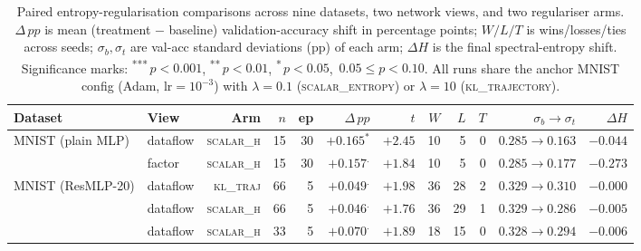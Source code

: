 %
%

\begin{table}[t]
\centering
\caption{Paired entropy-regularisation comparisons across nine datasets,
two network views, and two regulariser arms.
$\Delta\,pp$ is mean (treatment $-$ baseline) validation-accuracy shift
in percentage points; $W/L/T$ is wins/losses/ties across seeds;
$\sigma_b,\sigma_t$ are val-acc standard deviations (pp) of each arm;
$\Delta H$ is the final spectral-entropy shift.
Significance marks: \textsuperscript{***}\,$p{<}0.001$,
\textsuperscript{**}\,$p{<}0.01$,
\textsuperscript{*}\,$p{<}0.05$,
\textsuperscript{\textperiodcentered}\,$0.05{\le}p{<}0.10$.
All runs share the anchor MNIST config (Adam, $\text{lr}=10^{-3}$) with
$\lambda{=}0.1$ (\textsc{scalar\_entropy}) or $\lambda{=}10$
(\textsc{kl\_trajectory}).}
\label{tab:spectral_entropy_views}
\small
\setlength{\tabcolsep}{4pt}
\begin{tabular}{@{}llrrrrrrrrrr@{}}
\toprule
Dataset & View & Arm & $n$ & ep & $\Delta\,pp$ & $t$ & $W$ & $L$ & $T$ & $\sigma_b\!\to\!\sigma_t$ & $\Delta H$ \\
\midrule
\multirow{2}{*}{MNIST (plain MLP)}
  & dataflow & \textsc{scalar\_h}  &  15 & 30 & $+0.165^{*}$    & $+2.45$ & 10 &  5 &   0 & $0.285{\to}0.163$ & $-0.044$ \\
  & factor   & \textsc{scalar\_h}  &  15 & 30 & $+0.157^{.}$    & $+1.84$ & 10 &  5 &   0 & $0.285{\to}0.177$ & $-0.273$ \\
\midrule
\multirow{3}{*}{MNIST (ResMLP-20)}
  & dataflow & \textsc{kl\_traj}   &  66 &  5 & $+0.049^{.}$    & $+1.98$ & 36 & 28 &   2 & $0.329{\to}0.310$ & $-0.000$ \\
  & dataflow & \textsc{scalar\_h}  &  66 &  5 & $+0.046^{.}$    & $+1.76$ & 36 & 29 &   1 & $0.329{\to}0.286$ & $-0.005$ \\
  & dataflow & \textsc{scalar\_h}  &  33 &  5 & $+0.070^{.}$    & $+1.89$ & 18 & 15 &   0 & $0.328{\to}0.294$ & $-0.006$ \\

\end{tabular}
\end{table}
